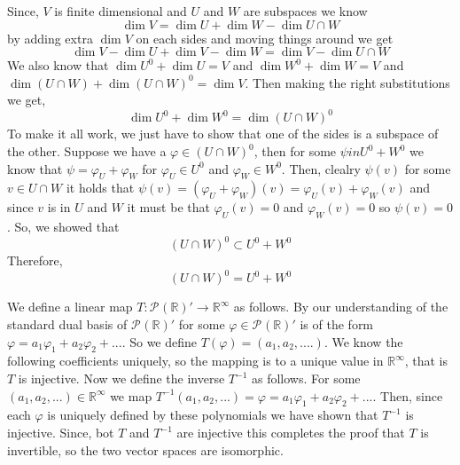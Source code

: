 \documentclass[10pt, twocolumn]{article}
\newcommand{\R}{\mathbb{R}}
\newcommand{\poly}[2]{\mathcal{P}_{#1}\left(#2\right)}
\newcommand{\inv}[1]{#1^{-1}}
\newcommand{\annhilator}[1]{#1^{0}}
\begin{document}
\begin{q}[23]
    Since, $ V $ is finite dimensional and $ U $ and $ W $ are subspaces we know 
    $$ \dim V = \dim U + \dim W - \dim U \cap W $$
    by adding extra $ \dim V $ on each sides and moving things around we get
    $$ \dim V - \dim U + \dim V - \dim W = \dim V - \dim U \cap W $$
    We also know that $ \dim \annhilator{U} + \dim U = V $ and $ \dim \annhilator{W} + \dim W = V $ and 
    $ \dim (U \cap W) + \dim \annhilator{(U \cap W)} = \dim V $. 
    Then making the right substitutions we get, 
    $$ \dim \annhilator{U} + \dim \annhilator{W} = \dim \annhilator{(U \cap W)} $$
    To make it all work, we just have to show that one of the sides is a subspace of the other. 
    Suppose we have a $ \varphi \in (U \cap W)^0 $, then for some $ \psi in U^0 + W^0 $ we know that $ \psi = \varphi_U + \varphi_W $ for $ \varphi_U \in \annhilator{U}  $ and $ \varphi_W \in \annhilator{W} $. 
    Then, clealry $ \psi(v) $ for some $ v\in U \cap W $ it holds that $ \psi(v) = (\varphi_U + \varphi_W)(v) = \varphi_U(v) + \varphi_W(v) $ and since $ v $ is in $ U $ and $ W $ it must be that $ \varphi_U(v) = 0 $ and $ \varphi_W(v) = 0 $ so $ \psi(v) = 0 $. 
    So, we showed that 
    $$ (U \cap W)^0  \subset U^0 + W^0 $$
    Therefore, 
    $$ (U \cap W)^0  = U^0 + W^0 $$
\end{q}
\begin{q}[34]
    
\end{q}
\begin{q}[35]
    We define a linear map $ T : \poly{}{\R}' \to \R^\infty $ as follows. 
    By our understanding of the standard dual basis of $ \poly{}{\R}' $ for some $ \varphi \in \poly{}{\R}' $ is of the form $ \varphi = a_1 \varphi_1 + a_2 \varphi_2 + ... $. 
    So we define $ T(\varphi) = (a_1, a_2, ....) $. We know the following coefficients uniquely, so the mapping is to a unique value in $ \R^\infty $, that is $ T $ is injective. 
    Now we define the inverse $ \inv{T} $ as follows. 
    For some $ (a_1, a_2, ...) \in \R^\infty $ we map $ \inv{T} (a_1, a_2, ...) = \varphi = a_1 \varphi_1 + a_2 \varphi_2 + ... $. 
    Then, since each $ \varphi $ is uniquely defined by these polynomials we have shown that $ \inv{T} $ is injective. 
    Since, bot $ T $ and $ \inv{T} $ are injective this completes the proof that $ T $ is invertible, so the two vector spaces are isomorphic.
\end{q}
\end{document}
